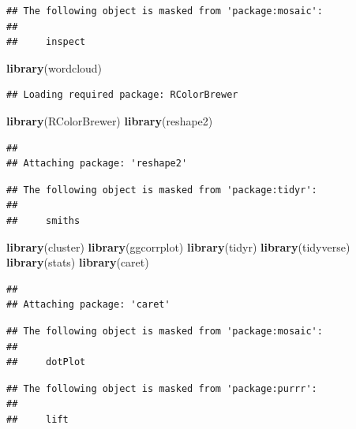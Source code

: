 \documentclass[
]{article}
\newenvironment{Shaded}{\begin{snugshade}}{\end{snugshade}}
\newcommand{\FunctionTok}[1]{\textcolor[rgb]{0.13,0.29,0.53}{\textbf{#1}}}
\newcommand{\NormalTok}[1]{#1}
\begin{document}
\begin{verbatim}
## The following object is masked from 'package:mosaic':
## 
##     inspect
\end{verbatim}

\begin{Shaded}
\begin{Highlighting}[]
\FunctionTok{library}\NormalTok{(wordcloud)}
\end{Highlighting}
\end{Shaded}

\begin{verbatim}
## Loading required package: RColorBrewer
\end{verbatim}

\begin{Shaded}
\begin{Highlighting}[]
\FunctionTok{library}\NormalTok{(RColorBrewer)}
\FunctionTok{library}\NormalTok{(reshape2)}
\end{Highlighting}
\end{Shaded}

\begin{verbatim}
## 
## Attaching package: 'reshape2'
\end{verbatim}

\begin{verbatim}
## The following object is masked from 'package:tidyr':
## 
##     smiths
\end{verbatim}

\begin{Shaded}
\begin{Highlighting}[]
\FunctionTok{library}\NormalTok{(cluster)}
\FunctionTok{library}\NormalTok{(ggcorrplot)}
\FunctionTok{library}\NormalTok{(tidyr)}
\FunctionTok{library}\NormalTok{(tidyverse)}
\FunctionTok{library}\NormalTok{(stats)}
\FunctionTok{library}\NormalTok{(caret)}
\end{Highlighting}
\end{Shaded}

\begin{verbatim}
## 
## Attaching package: 'caret'
\end{verbatim}

\begin{verbatim}
## The following object is masked from 'package:mosaic':
## 
##     dotPlot
\end{verbatim}

\begin{verbatim}
## The following object is masked from 'package:purrr':
## 
##     lift
\end{verbatim}
\end{document}
